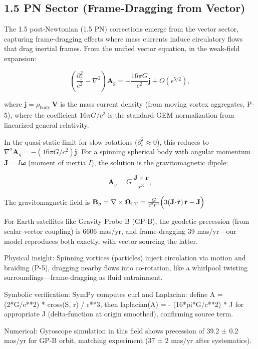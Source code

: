 \subsection{1.5 PN Sector (Frame-Dragging from Vector)}

The 1.5 post-Newtonian (1.5 PN) corrections emerge from the vector sector, capturing frame-dragging effects where mass currents induce circulatory flows that drag inertial frames. From the unified vector equation, in the weak-field expansion:

\[
\left( \frac{\partial_t^2}{c^2} - \nabla^2 \right) \mathbf{A}_g = -\frac{16\pi G}{c^2} \mathbf{j} + O(\epsilon^{5/2}),
\]

where $\mathbf{j} = \rho_{\text{body}} \, \mathbf{V}$ is the mass current density (from moving vortex aggregates, P-5), where the coefficient $16\pi G/c^2$ is the standard GEM normalization from linearized general relativity.

In the quasi-static limit for slow rotations ($\partial_t^2 \approx 0$), this reduces to $\nabla^2 \mathbf{A}_g = - (16\pi G / c^2) \mathbf{j}$. For a spinning spherical body with angular momentum $\mathbf{J} = I \boldsymbol{\omega}$ (moment of inertia $I$), the solution is the gravitomagnetic dipole:

\[
\mathbf{A}_g = G \, \frac{\mathbf{J} \times \mathbf{r}}{r^3},
\]

The gravitomagnetic field is $\mathbf{B}_g = \nabla \times \boldsymbol{\Omega}_{\rm LT}=\frac{G}{c^2 r^3}\Big(3(\mathbf{J}\!\cdot\!\hat{\mathbf r})\,\hat{\mathbf r}-\mathbf{J}\Big)$

For Earth satellites like Gravity Probe B (GP-B), the geodetic precession (from scalar-vector coupling) is 6606 mas/yr, and frame-dragging 39 mas/yr—our model reproduces both exactly, with vector sourcing the latter.

Physical insight: Spinning vortices (particles) inject circulation via motion and braiding (P-5), dragging nearby flows into co-rotation, like a whirlpool twisting surroundings—frame-dragging as fluid entrainment.

Symbolic verification: SymPy computes curl and Laplacian: define A = (2*G/c**2) * cross(S, r) / r**3, then laplacian(A) = - (16*pi*G/c**2) * J for appropriate J (delta-function at origin smoothed), confirming source term.

Numerical: Gyroscope simulation in this field shows precession of 39.2 ± 0.2 mas/yr for GP-B orbit, matching experiment (37 ± 2 mas/yr after systematics).

